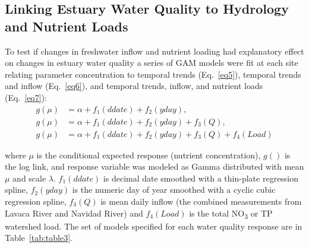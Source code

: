 \documentclass[fleqn,10pt,lineno]{wlpeerj} %
\begin{document}
\hypertarget{linking-estuary-water-quality-to-hydrology-and-nutrient-loads}{%
\subsection*{Linking Estuary Water Quality to Hydrology and Nutrient
Loads}\label{linking-estuary-water-quality-to-hydrology-and-nutrient-loads}}

To test if changes in freshwater inflow and nutrient loading had
explanatory effect on changes in estuary water quality a series of GAM
models were fit at each site relating parameter concentration to
temporal trends (Eq.~\ref{eq5}), temporal trends and inflow
(Eq.~\ref{eq6}), and temporal trends, inflow, and nutrient loads
(Eq.~\ref{eq7}): \begin{align}
g(\mu) &= \alpha + f_1(ddate) + f_2(yday), \label{eq5} \\
g(\mu) &= \alpha + f_1(ddate) + f_2(yday) + f_3(Q), \label{eq6} \\
g(\mu) &= \alpha + f_1(ddate) + f_2(yday) + f_3(Q) + f_4(Load) \label{eq7}
\end{align}

where \(\mu\) is the conditional expected response (nutrient
concentration), \(g()\) is the log link, and response variable was
modeled as Gamma distributed with mean \(\mu\) and scale \(\lambda\).
\(f_1(ddate)\) is decimal date smoothed with a thin-plate regression
spline, \(f_2(yday)\) is the numeric day of year smoothed with a cyclic
cubic regression spline, \(f_3(Q)\) is mean daily inflow (the combined
measurements from Lavaca River and Navidad River) and \(f_4(Load)\) is
the total NO\textsubscript{3} or TP watershed load. The set of models
specified for each water quality response are in Table~\ref{tab:table3}.
\end{document}
